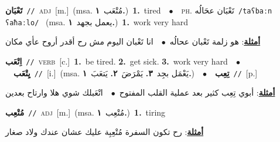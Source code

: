 \documentclass[10pt,a4paper,twoside]{article} %
\begin{document}
\begin{multicols}{2}
{{{{{{{{{{{{\setlength\topsep{0pt}\textbf{\foreignlanguage{arabic}{تَعْبَان}}\ {\color{gray}\texttt{//}\color{black}}\ \textsc{adj}\ [m.]\ \color{gray}(msa. \foreignlanguage{arabic}{مُتْعَب}~\foreignlanguage{arabic}{\textbf{١.}})\color{black}\ \textbf{1.}~tired\ \ $\bullet$\ \ \textsc{ph.} \color{gray} \foreignlanguage{arabic}{تَعْبَان عحَالُه}\color{black}\ {\color{gray}\texttt{/{\sffamily taʕbaːn ʕaħaːlo}/}\color{black}}\ \color{gray} (msa. \foreignlanguage{arabic}{يعمل بجهد}~\foreignlanguage{arabic}{\textbf{١.}})\color{black}\ \textbf{1.}~work very hard\  \begin{flushright}\color{gray}\foreignlanguage{arabic}{\textbf{\underline{\foreignlanguage{arabic}{أمثلة}}}: هو زلمة تَعْبان عحالُه\ $\bullet$\ \  انا تَعْبان اليوم مش رح أقدر أروح عأي مكان}\end{flushright}\color{black}} \vspace{2mm}

{\setlength\topsep{0pt}\textbf{\foreignlanguage{arabic}{اِتْعَب}}\ {\color{gray}\texttt{//}\color{black}}\ \textsc{verb}\ [c.]\ \textbf{1.}~be tired.  \textbf{2.}~get sick.  \textbf{3.}~work very hard\ \ $\bullet$\ \ \setlength\topsep{0pt}\textbf{\foreignlanguage{arabic}{يِتْعَب}}\ {\color{gray}\texttt{//}\color{black}}\ [i.]\ \color{gray}(msa. \foreignlanguage{arabic}{يَعْمَل بجِد}~\foreignlanguage{arabic}{\textbf{٣.}}  \foreignlanguage{arabic}{يَمْرَضَ}~\foreignlanguage{arabic}{\textbf{٢.}}  \foreignlanguage{arabic}{يَتعَبَ}~\foreignlanguage{arabic}{\textbf{١.}})\color{black}\ \ $\bullet$\ \ \setlength\topsep{0pt}\textbf{\foreignlanguage{arabic}{تِعِب}}\ {\color{gray}\texttt{//}\color{black}}\ [p.]\  \begin{flushright}\color{gray}\foreignlanguage{arabic}{\textbf{\underline{\foreignlanguage{arabic}{أمثلة}}}: أبوي تِعِب كثير بعد عملية القلب المفتوح\ $\bullet$\ \  اتْعَبلك شوي هلا وارتاح بعدين}\end{flushright}\color{black}} \vspace{2mm}

{\setlength\topsep{0pt}\textbf{\foreignlanguage{arabic}{مُتْعِب}}\ {\color{gray}\texttt{//}\color{black}}\ \textsc{adj}\ [m.]\ \color{gray}(msa. \foreignlanguage{arabic}{مُتْعِب}~\foreignlanguage{arabic}{\textbf{١.}})\color{black}\ \textbf{1.}~tiring\  \begin{flushright}\color{gray}\foreignlanguage{arabic}{\textbf{\underline{\foreignlanguage{arabic}{أمثلة}}}: رح تكون السفرة مُتْعِبِة عليك عشان عندك ولاد صغار}\end{flushright}\color{black}} \vspace{2mm}

}}}}}}}}}}}
\end{multicols}
\end{document}
